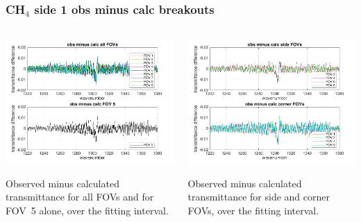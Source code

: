 \documentclass[10pt]{beamer}
\begin{document}
\begin{frame}
\frametitle{CH$_4$ side 1 obs minus calc breakouts}
\begin{columns}[t]
\begin{column}{0.5\textwidth}
  \begin{centering}
  \includegraphics[width=\textwidth]{01-07_pfl_s1_CH4/CH4_breakout_1.png}
  \end{centering}\vspace{3mm}

Observed minus calculated transmittance for all FOVs and for FOV~5
alone, over the fitting interval.

\end{column}
\begin{column}{0.5\textwidth}  
  \begin{centering}
  \includegraphics[width=\textwidth]{01-07_pfl_s1_CH4/CH4_breakout_2.png}
  \end{centering}\vspace{3mm}

Observed minus calculated transmittance for side and corner FOVs,
over the fitting interval.

\end{column}
\end{columns}
\end{frame}
\end{document}
